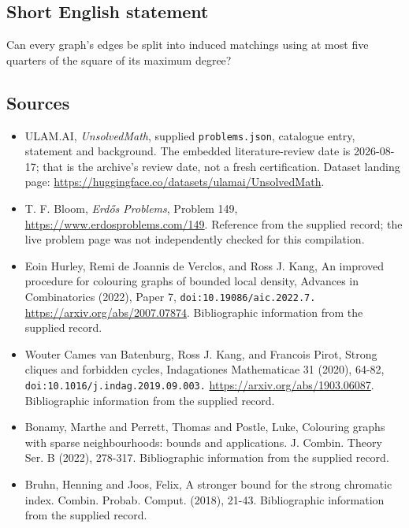 \documentclass[11pt,a4paper]{article}
\begin{document}
\subsection{Short English statement}

Can every graph's edges be split into induced matchings using at most five quarters of the square of its maximum degree?

\subsection{Sources}

{\small

\begin{itemize}

\item[\hypertarget{source:statement:1}{S1}] ULAM.AI, \emph{UnsolvedMath}, supplied \texttt{problems.json}, catalogue entry, statement and background. The embedded literature-review date is 2026-08-17; that is the archive’s review date, not a fresh certification. Dataset landing page: \url{https://huggingface.co/datasets/ulamai/UnsolvedMath}.

\item[\hypertarget{source:statement:2}{S2}] T. F. Bloom, \emph{Erdős Problems}, Problem 149, \url{https://www.erdosproblems.com/149}. Reference from the supplied record; the live problem page was not independently checked for this compilation.

\item[\hypertarget{source:statement:3}{S3}] Eoin Hurley, Remi de Joannis de Verclos, and Ross J. Kang, An improved procedure for colouring graphs of bounded local density, Advances in Combinatorics (2022), Paper 7, \nolinkurl{doi:10.19086/aic.2022.7.} \url{https://arxiv.org/abs/2007.07874}. Bibliographic information from the supplied record.

\item[\hypertarget{source:statement:4}{S4}] Wouter Cames van Batenburg, Ross J. Kang, and Francois Pirot, Strong cliques and forbidden cycles, Indagationes Mathematicae 31 (2020), 64-82, \nolinkurl{doi:10.1016/j.indag.2019.09.003.} \url{https://arxiv.org/abs/1903.06087}. Bibliographic information from the supplied record.

\item[\hypertarget{source:statement:5}{S5}] Bonamy, Marthe and Perrett, Thomas and Postle, Luke, Colouring graphs with sparse neighbourhoods: bounds and applications. J. Combin. Theory Ser. B (2022), 278-317. Bibliographic information from the supplied record.

\item[\hypertarget{source:statement:6}{S6}] Bruhn, Henning and Joos, Felix, A stronger bound for the strong chromatic index. Combin. Probab. Comput. (2018), 21-43. Bibliographic information from the supplied record.

\end{itemize}

}

\label{end:statement}
\end{document}

